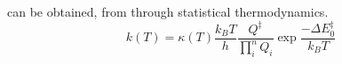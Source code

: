 \documentclass[preprint, 11pt]{elsarticle} %
\begin{document}

 can be obtained, from  through statistical thermodynamics. 
\begin{equation}
    k(T) = \kappa(T) \frac{k_B T}{h} \frac{Q^\ddagger}{\prod^{n}_{i} Q_i} \exp{\frac{-\Delta E^{\ddagger}_{0}}{k_B T}}
    \label{eyring:2}
\end{equation}
\end{document}
